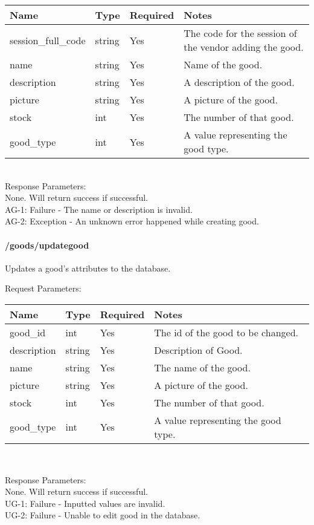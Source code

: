 \documentclass{article}[11pt]
\begin{document}
\noindent
\begin{tabular}{|l|l|l|l|}
\hline
\textbf{Name} & \textbf{Type} & \textbf{Required} & \textbf{Notes} \\
\hline
session\_full\_code & string & Yes & The code for the session of the vendor adding the good. \\
name & string & Yes & Name of the good. \\
description & string & Yes & A description of the good. \\
picture & string & Yes & A picture of the good. \\
stock & int & Yes & The number of that good. \\
good\_type & int & Yes & A value representing the good type. \\
\hline
\end{tabular} \\

\noindent
Response Parameters: \\
None. Will return success if successful. \\

\ErrorsSession
AG-1: Failure - The name or description is invalid. \\
AG-2: Exception - An unknown error happened while creating good. \\



\paragraph{/goods/updategood}\textbf{}

Updates a good's attributes to the database.

\noindent
Request Parameters:

\begin{tabular}{|l|l|l|l|}
\hline
\textbf{Name} & \textbf{Type} & \textbf{Required} & \textbf{Notes} \\
\hline
good\_id & int & Yes & The id of the good to be changed. \\
description & string & Yes & Description of Good. \\
name & string & Yes & The name of the good. \\
picture & string & Yes & A picture of the good. \\
stock & int & Yes & The number of that good. \\
good\_type & int & Yes & A value representing the good type. \\
\hline
\end{tabular} \\

\noindent

\noindent
Response Parameters: \\
None. Will return success if successful. \\

\ErrorsSession
UG-1: Failure - Inputted values are invalid. \\
UG-2: Failure - Unable to edit good in the database. \\
\end{document}
